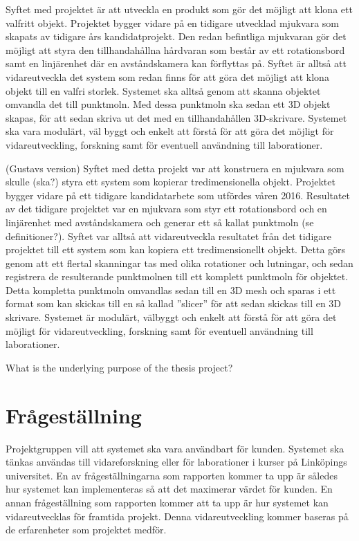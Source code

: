 Syftet med projektet är att utveckla en produkt som gör det möjligt att klona ett valfritt objekt. Projektet bygger vidare på en tidigare utvecklad mjukvara som skapats av tidigare års kandidatprojekt. Den redan befintliga mjukvaran gör det möjligt att styra den tillhandahållna hårdvaran som består av ett rotationsbord samt en linjärenhet där en avståndskamera kan förflyttas på. Syftet är alltså att vidareutveckla det system som redan finns för att göra det möjligt att klona objekt till en valfri storlek. Systemet ska alltså genom att skanna objektet omvandla det till punktmoln. Med dessa punktmoln ska sedan ett 3D objekt skapas, för att sedan skriva ut det med en tillhandahållen 3D-skrivare. Systemet ska vara modulärt, väl byggt och enkelt att förstå för att göra det möjligt för vidareutveckling, forskning samt för eventuell användning till laborationer. 

(Gustavs version)
Syftet med detta projekt var att konstruera en mjukvara som skulle (ska?) styra ett system som kopierar tredimensionella objekt. Projektet bygger vidare på ett tidigare kandidatarbete som utfördes våren 2016. Resultatet av det tidigare projektet var en mjukvara som styr ett rotationsbord och en linjärenhet med avståndskamera och generar ett så kallat punktmoln (se definitioner?).  Syftet var alltså att vidareutveckla resultatet från det tidigare projektet till ett system som kan kopiera ett tredimensionellt objekt. Detta görs genom att ett flertal skanningar tas med olika rotationer och lutningar, och sedan registrera de resulterande punktmolnen till ett komplett punktmoln för objektet. Detta kompletta punktmoln omvandlas sedan till en 3D mesh och sparas i ett format som kan skickas till en så kallad ”slicer” för att sedan skickas till en 3D skrivare. Systemet är modulärt, välbyggt och enkelt att förstå för att göra det möjligt för vidareutveckling, forskning samt för eventuell användning till laborationer.   


What is the underlying purpose of the thesis project?

\section{Frågeställning}
\label{sec:research-questions}

Projektgruppen vill att systemet ska vara användbart för kunden. Systemet ska tänkas användas till vidareforskning eller för laborationer i kurser på Linköpings universitet. En av frågeställningarna som rapporten kommer ta upp är således hur systemet kan implementeras så att det maximerar värdet för kunden. En annan frågeställning som rapporten kommer att ta upp är hur systemet kan vidareutvecklas för framtida projekt. Denna vidareutveckling kommer baseras på de erfarenheter som projektet medför.


